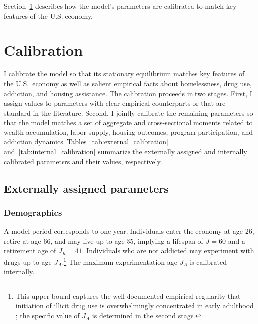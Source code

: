 \documentclass[parskip=full]{article}
\theoremstyle{plain}
\theoremstyle{definition}
\theoremstyle{remark}
\begin{document}
Section~\ref{sec:calibration} describes how the model's parameters are calibrated to match key features of the U.S. economy.

\section{Calibration}
\label{sec:calibration}

I calibrate the model so that its stationary equilibrium matches key features of the U.S.\ economy as well as salient empirical facts about homelessness, drug use, addiction, and housing assistance. The calibration proceeds in two stages. First, I assign values to parameters with clear empirical counterparts or that are standard in the literature. Second, I jointly calibrate the remaining parameters so that the model matches a set of aggregate and cross-sectional moments related to wealth accumulation, labor supply, housing outcomes, program participation, and addiction dynamics. Tables~\ref{tab:external_calibration} and~\ref{tab:internal_calibration} summarize the externally assigned and internally calibrated parameters and their values, respectively.

\subsection{Externally assigned parameters}
\label{sec:external_calibration}

\subsubsection{Demographics}

A model period corresponds to one year. Individuals enter the economy at age 26, retire at age 66, and may live up to age 85, implying a lifespan of $J=60$ and a retirement age of $J_R=41$. Individuals who are not addicted may experiment with drugs up to age $J_A$.\footnote{This upper bound captures the well-documented empirical regularity that initiation of illicit drug use is overwhelmingly concentrated in early adulthood \citep{nsduh_2024}; the specific value of $J_A$ is determined in the second stage.} The maximum experimentation age $J_A$ is calibrated internally. 
\end{document}
